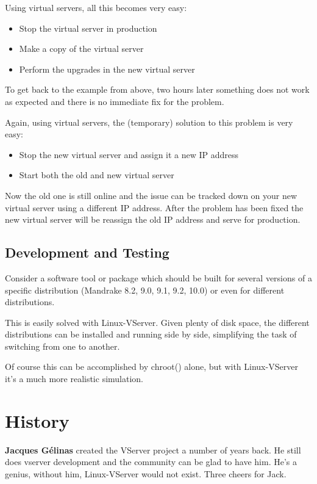 Using virtual servers, all this becomes very easy:

\begin{itemize}
	\item Stop the virtual server in production
	\item Make a copy of the virtual server
	\item Perform the upgrades in the new virtual server
\end{itemize}

To get back to the example from above, two hours later something does not work
as expected and there is no immediate fix for the problem.

Again, using virtual servers, the (temporary) solution to this problem is very
easy:

\begin{itemize}
	\item Stop the new virtual server and assign it a new IP address
	\item Start both the old and new virtual server
\end{itemize}

Now the old one is still online and the issue can be tracked down on your new
virtual server using a different IP address. After the problem has been fixed
the new virtual server will be reassign the old IP address and serve for
production.


\subsection{Development and Testing}

Consider a software tool or package which should be built for several versions
of a specific distribution (Mandrake 8.2, 9.0, 9.1, 9.2, 10.0) or even for
different distributions.

This is easily solved with Linux-VServer. Given plenty of disk space, the
different distributions can be installed and running side by side, simplifying
the task of switching from one to another.

Of course this can be accomplished by chroot() alone, but with Linux-VServer
it's a much more realistic simulation.


\section{History}

\textbf{Jacques Gélinas} created the VServer project a number of years back.
He still does vserver development and the community can be glad to have him.
He's a genius, without him, Linux-VServer would not exist. Three cheers for
Jack.

